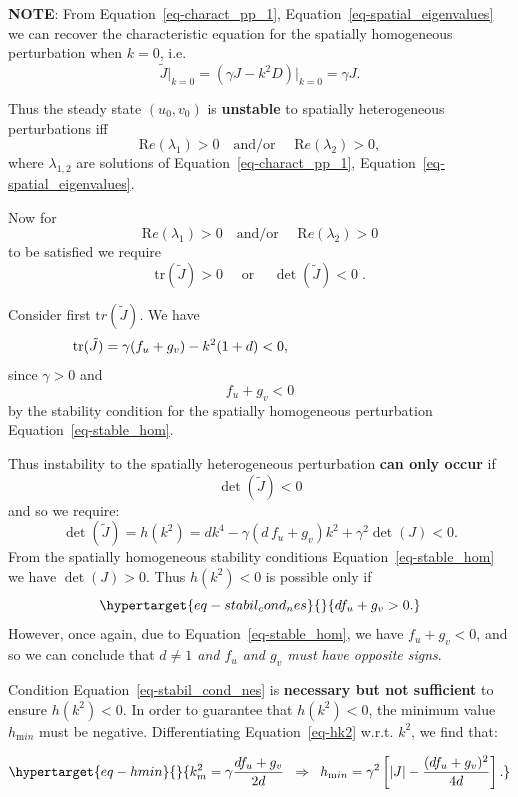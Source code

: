 \documentclass[
  letterpaper,
  DIV=11,
  numbers=noendperiod]{scrreprt}
\theoremstyle{plain}
\theoremstyle{definition}
\theoremstyle{plain}
\theoremstyle{remark}
\begin{document}
\textbf{NOTE}: From Equation~\ref{eq-charact_pp_1},
Equation~\ref{eq-spatial_eigenvalues} we can recover the characteristic
equation for the spatially homogeneous perturbation when \(k=0\), i.e.~
\[
\tilde J \Big|_{k=0} = ( \gamma J - k^2 D )\Big|_{k=0} = \gamma J.
\]

Thus the steady state \((u_0, v_0)\) is \textbf{unstable} to spatially
heterogeneous perturbations iff \[
{\mathrm Re}(\lambda_1) > 0 \quad \text{and/or } \quad {\mathrm Re}(\lambda_2) >0,
\] where \(\lambda_{1,2}\) are solutions of
Equation~\ref{eq-charact_pp_1}, Equation~\ref{eq-spatial_eigenvalues}.

Now for \[
{\mathrm Re}(\lambda_1) > 0 \quad \text{and/or } \quad {\mathrm Re}(\lambda_2) >0
\] to be satisfied we require \[
\text{tr}(\tilde J) > 0 \quad \text{ or } \quad \det(\tilde J) <0 \; .
\]

Consider first \({\mathrm tr} (\tilde{J})\). We have \[
\text{tr}(\tilde J) = \gamma ( f_u+ g_v) - k^2(1+d) < 0, \hspace{4 cm}  
\] since \(\gamma > 0\) and \[ 
f_u+ g_v < 0
\] by the stability condition for the spatially homogeneous perturbation
Equation~\ref{eq-stable_hom}.

Thus instability to the spatially heterogeneous perturbation \textbf{can
only occur} if \[
\det(\tilde J) < 0
\] and so we require: \[
\det(\tilde J) = h(k^2) = dk^4  - \gamma ( d\,  f_u + g_v) k^2 + \gamma^2 \det(J) < 0. 
\] From the spatially homogeneous stability conditions
Equation~\ref{eq-stable_hom} we have \(\det(J) >0\). Thus \(h(k^2)<0\)
is possible only if
\begin{equation}\protect\hypertarget{eq-stabil_cond_nes}{}{
d f_u + g_v >0.
}\label{eq-stabil_cond_nes}\end{equation} However, once again, due to
Equation~\ref{eq-stable_hom}, we have \(f_u+ g_v <0\), and so we can
conclude that \emph{\(d\neq 1\) and \(f_u\) and \(g_v\) must have
opposite signs}.

Condition Equation~\ref{eq-stabil_cond_nes} is \textbf{necessary but not
sufficient} to ensure \(h(k^2) <0\). In order to guarantee that
\(h(k^2) < 0\), the minimum value \(h_{{\mathrm min}}\) must be
negative. Differentiating Equation~\ref{eq-hk2} w.r.t. \(k^2\), we find
that:

\begin{equation}\protect\hypertarget{eq-hmin}{}{
k^2_{m} = \gamma \frac{d f_u + g_v}{2d} \;\; \Rightarrow \;\; h_{{\mathrm min}} = \gamma^2 \left[ | J | - \frac{(df_u + g_v)^2}{4d} \right].
}\label{eq-hmin}\end{equation}
\end{document}
